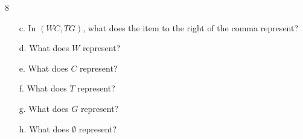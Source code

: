 \documentclass[a4paper,12pt]{book}
\newcounter{question}
\begin{document}
\begin{question}{\thequestion}{8}
\begin{itemize}
            \item[c.]   In $(WC, TG)$, what does the item to the right of the comma represent?
                
            \item[d.]   What does $W$ represent?
                
            \item[e.]   What does $C$ represent?
                
            \item[f.]   What does $T$ represent?
                
            \item[g.]   What does $G$ represent?
                
            \item[h.]   What does $\emptyset$ represent?
                
        \end{itemize}

    
\end{question}

\newpage
\end{document}

